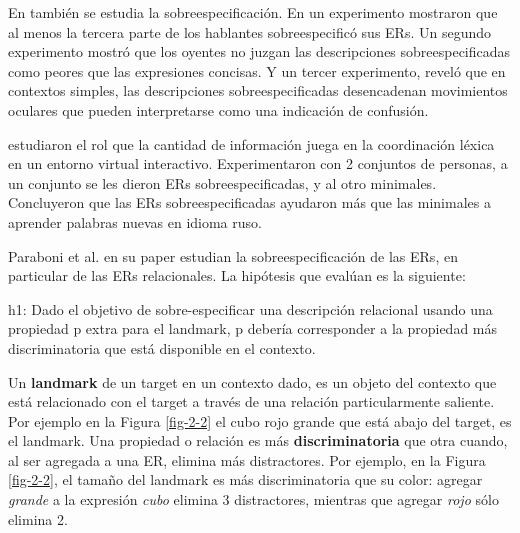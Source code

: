 En \cite{do-speakers} tambi\'en se estudia la sobreespecificaci\'on. En un experimento mostraron que al menos la tercera parte de los hablantes sobreespecific\'o sus ERs. Un segundo experimento mostr\'o que los oyentes no juzgan las descripciones sobreespecificadas como peores que las expresiones concisas. Y un tercer experimento, revel\'o que en contextos simples, las descripciones sobreespecificadas desencadenan movimientos oculares que pueden interpretarse como una indicaci\'on de confusi\'on. 


\cite{Lu_sasha2015} estudiaron el rol que la cantidad de informaci\'on juega en la coordinaci\'on l\'exica en un entorno virtual interactivo. Experimentaron con 2 conjuntos de personas, a un conjunto se les dieron ERs sobreespecificadas, y al otro minimales. Concluyeron que las ERs sobreespecificadas ayudaron m\'as que las minimales a aprender palabras nuevas en idioma ruso.


Paraboni et al. en su paper \cite{acl-Paraboni15} estudian la sobreespecificaci\'on de las ERs, en particular de las ERs relacionales.
La hip\'otesis que eval\'uan es la siguiente:
\begin{it}
\begin{displayquote}h1: Dado el objetivo de sobre-especificar una descripci\'on relacional usando una propiedad p extra para el landmark, p deber\'ia corresponder a la propiedad m\'as discriminatoria que est\'a disponible en el contexto. %
\end{displayquote}
\end{it}

Un \textbf{landmark} de un target en un contexto dado, es un objeto del contexto que est\'a relacionado con el target a trav\'es de una relaci\'on particularmente saliente. Por ejemplo en la Figura \ref{fig-2-2} el cubo rojo grande que est\'a abajo del target, es el landmark.
Una propiedad o relaci\'on es m\'as \textbf{discriminatoria} que otra cuando, al ser agregada a una ER, elimina m\'as distractores. Por ejemplo, en la Figura \ref{fig-2-2}, el tama\~no del landmark es m\'as discriminatoria que su color: agregar \emph{grande} a la expresi\'on \emph{cubo} elimina 3 distractores, mientras que agregar \emph{rojo} s\'olo elimina 2.

